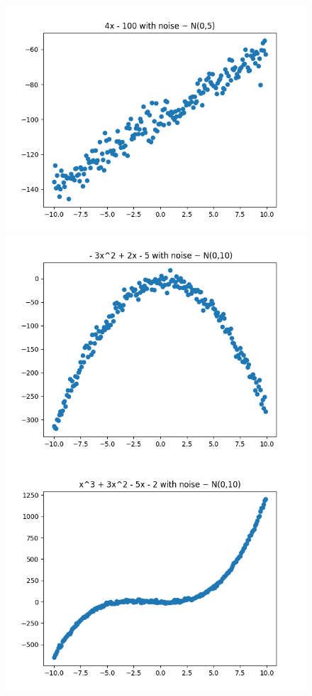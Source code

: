\documentclass[12pt]{article}
\begin{document}
\begin{figure}[H] 
\centering \includegraphics[scale=0.33]{polynomial1.png}
\includegraphics[scale=0.33]{polynomial2.png}
\includegraphics[scale=0.33]{polynomial3.png}
\end{figure}
\end{document}
